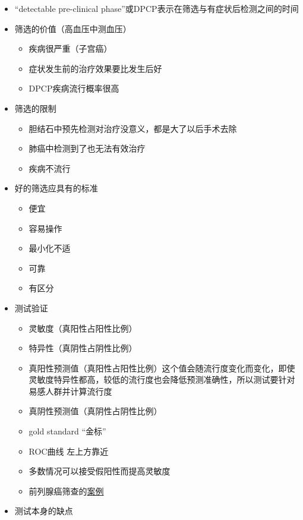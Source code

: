 \documentclass[
]{book}
\providecommand{\tightlist}{%
  \setlength{\itemsep}{0pt}\setlength{\parskip}{0pt}}
\begin{document}
\begin{itemize}
\tightlist
\item
  ``detectable pre-clinical phase''或DPCP表示在筛选与有症状后检测之间的时间
\item
  筛选的价值（高血压中测血压）

  \begin{itemize}
  \tightlist
  \item
    疾病很严重（子宫癌）
  \item
    症状发生前的治疗效果要比发生后好
  \item
    DPCP疾病流行概率很高
  \end{itemize}
\item
  筛选的限制

  \begin{itemize}
  \tightlist
  \item
    胆结石中预先检测对治疗没意义，都是大了以后手术去除
  \item
    肺癌中检测到了也无法有效治疗
  \item
    疾病不流行
  \end{itemize}
\item
  好的筛选应具有的标准

  \begin{itemize}
  \tightlist
  \item
    便宜
  \item
    容易操作
  \item
    最小化不适
  \item
    可靠
  \item
    有区分
  \end{itemize}
\item
  测试验证

  \begin{itemize}
  \tightlist
  \item
    灵敏度（真阳性占阳性比例）
  \item
    特异性（真阴性占阴性比例）
  \item
    真阳性预测值（真阳性占阳性比例）这个值会随流行度变化而变化，即使灵敏度特异性都高，较低的流行度也会降低预测准确性，所以测试要针对易感人群并计算流行度
  \item
    真阴性预测值（真阴性占阴性比例）
  \item
    gold standard ``金标''
  \item
    ROC曲线 左上方靠近
  \item
    多数情况可以接受假阳性而提高灵敏度
  \item
    前列腺癌筛查的\href{http://www.ncbi.nlm.nih.gov/pmc/articles/PMC137591/pdf/1471-2296-3-19.pdf}{案例}
  \end{itemize}
\item
  测试本身的缺点


\end{itemize}
\end{document}
